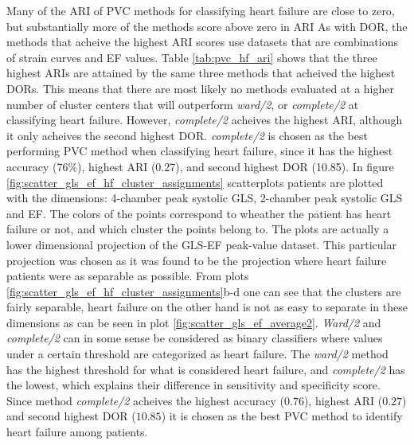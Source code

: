Many of the ARI of PVC methods for classifying heart failure are close to zero, but substantially more of the methods score above zero in ARI
As with DOR, the methods that acheive the highest ARI scores use datasets that are combinations of strain curves and EF values.
Table \ref{tab:pvc_hf_ari} shows that the three highest ARIs are attained by the same three methods that acheived the highest DORs. 
This means that there are most likely no methods evaluated at a higher number of cluster centers that will outperform \textit{ward/2}, or \textit{complete/2} at classifying heart failure. 
However, \textit{complete/2} acheives the highest ARI, although it only acheives the second highest DOR.
\textit{complete/2} is chosen as the best performing PVC method when classifying heart failure, 
since it has the highest accuracy (76$\%$), highest ARI (0.27), and second highest DOR (10.85). 
In figure \ref{fig:scatter_gls_ef_hf_cluster_assignments} scatterplots patients are plotted with the dimensions: 4-chamber peak systolic GLS, 2-chamber peak systolic GLS and EF. 
The colors of the points correspond to wheather the patient has heart failure or not, and which cluster the points belong to.
The plots are actually a lower dimensional projection of the GLS-EF peak-value dataset. 
This particular projection was chosen as it was found to be the projection where heart failure patients were as separable as possible. 
From plots \ref{fig:scatter_gls_ef_hf_cluster_assignments}b-d one can see that the clusters are fairly separable, 
heart failure on the other hand is not as easy to separate in these dimensions as can be seen in plot \ref{fig:scatter_gls_ef_average2}. 
\textit{Ward/2} and \textit{complete/2} can in some sense be considered as binary classifiers where values under a certain threshold are categorized as heart failure.
The \textit{ward/2} method has the highest threshold for what is considered heart failure, and \textit{complete/2} has the lowest, 
which explains their difference in sensitivity and specificity score. 
Since method \textit{complete/2} acheives the highest accuracy ($0.76$), highest ARI ($0.27$) and second highest DOR ($10.85$) it is chosen as the best PVC method to identify heart failure among patients.
\bigskip

